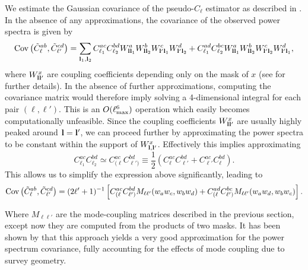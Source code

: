 \documentclass[a4paper,11pt]{article}
\begin{document}
    We estimate the Gaussian covariance of the pseudo-$C_\ell$ estimator as described in \cite{2004MNRAS.349..603E,2019arXiv190611765G}. In the absence of any approximations, the covariance of the observed power spectra is given by
    \begin{equation}
      {\rm Cov}\left(\tilde{C}^{ab}_\ell,\tilde{C}^{cd}_{\ell'}\right)=\sum_{{\bf l}_1,{\bf l}_2} C^{ac}_{\ell_1}C^{bd}_{\ell_2}W^a_{{\bf l}{\bf l}_1}W^b_{{\bf l}{\bf l}_2}W^c_{{\bf l}'{\bf l}_1}W^d_{{\bf l}'{\bf l}_2} + C^{ad}_{\ell_1}C^{bc}_{\ell_2}W^a_{{\bf l}{\bf l}_1}W^b_{{\bf l}{\bf l}_2}W^c_{{\bf l}'{\bf l}_2}W^d_{{\bf l}'{\bf l}_1},
    \end{equation}
    where $W^x_{{\bf l}{\bf l}'}$ are coupling coefficients depending only on the mask of $x$ (see \cite{2019arXiv190611765G} for further details). In the absence of further approximations, computing the covariance matrix would therefore imply solving a 4-dimensional integral for each pair $(\ell,\ell')$. This is an $O(\ell_{\rm max}^6)$ operation which easily becomes computationally unfeasible. Since the coupling coefficients $W^x_{{\bf l}{\bf l}'}$ are usually highly peaked around ${\bf l}={\bf l}'$, we can proceed further by approximating the power spectra to be constant within the support of $W^x_{{\bf l},{\bf l}'}$. Effectively this implies approximating
    \begin{equation}
      C^{ac}_{\ell_1}C^{bd}_{\ell_2}\simeq C^{ac}_{(\ell}C^{bd}_{\ell')}\equiv\frac{1}{2}\left(C^{ac}_\ell C^{bd}_{\ell'}+C^{ac}_{\ell'} C^{bd}_\ell\right).
    \end{equation}
    This allows us to simplify the expression above significantly, leading to
    \begin{equation}
      {\rm Cov}\left(\tilde{C}^{ab}_\ell,\tilde{C}^{cd}_{\ell'}\right)=(2\ell'+1)^{-1}\left[C^{ac}_{(\ell}C^{bd}_{\ell')}M_{\ell\ell'}(w_aw_c,w_bw_d)+C^{ad}_{(\ell}C^{bc}_{\ell')}M_{\ell\ell'}(w_aw_d,w_bw_c)\right].
    \end{equation}

    Where $M_{\ell\ell'}$ are the mode-coupling matrices described in the previous section, except now they are computed from the products of two masks. It has been shown by \cite{2019arXiv190611765G} that this approach yields a very good approximation for the power spectrum covariance, fully accounting for the effects of mode coupling due to survey geometry.
\end{document}
